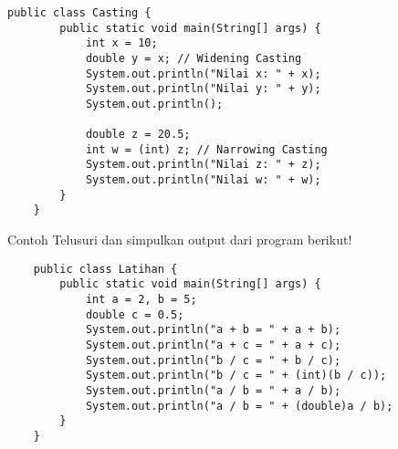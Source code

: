 \documentclass[aspectratio=169]{beamer}
\theoremstyle{definition}
\begin{document}
    \begin{frame}[fragile]
        \frametitle{\insertsection}
        \begin{lstlisting}[caption={Contoh penggunaan Casting}]
    public class Casting {
        public static void main(String[] args) {
            int x = 10;
            double y = x; // Widening Casting
            System.out.println("Nilai x: " + x);
            System.out.println("Nilai y: " + y);
            System.out.println();

            double z = 20.5;
            int w = (int) z; // Narrowing Casting
            System.out.println("Nilai z: " + z);
            System.out.println("Nilai w: " + w);
        }
    }
        \end{lstlisting}
    \end{frame}

    \begin{frame}[fragile]
        \begin{exampleblock}{Contoh}
            Telusuri dan simpulkan output dari program berikut!
        \end{exampleblock}
        \begin{lstlisting}
    public class Latihan {
        public static void main(String[] args) {
            int a = 2, b = 5;
            double c = 0.5;
            System.out.println("a + b = " + a + b);
            System.out.println("a + c = " + a + c);
            System.out.println("b / c = " + b / c);
            System.out.println("b / c = " + (int)(b / c));
            System.out.println("a / b = " + a / b);
            System.out.println("a / b = " + (double)a / b);
        }
    }
        \end{lstlisting}
    \end{frame}
\end{document}
